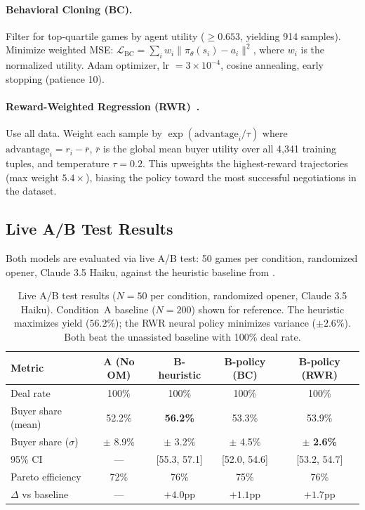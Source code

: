 \documentclass[11pt,a4paper]{article}
\begin{document}
\paragraph{Behavioral Cloning (BC).} Filter for top-quartile games by agent utility ($\geq 0.653$, yielding 914 samples). Minimize weighted MSE: $\mathcal{L}_\text{BC} = \sum_i w_i \|\pi_\theta(s_i) - a_i\|^2$, where $w_i$ is the normalized utility. Adam optimizer, lr $= 3 \times 10^{-4}$, cosine annealing, early stopping (patience 10).

\paragraph{Reward-Weighted Regression (RWR)~\citep{peters2007reinforcement}.} Use all data. Weight each sample by $\exp(\text{advantage}_i / \tau)$ where $\text{advantage}_i = r_i - \bar{r}$, $\bar{r}$ is the global mean buyer utility over all 4{,}341 training tuples, and temperature $\tau = 0.2$. This upweights the highest-reward trajectories (max weight $5.4\times$), biasing the policy toward the most successful negotiations in the dataset.

\subsection{Live A/B Test Results}

Both models are evaluated via live A/B test: 50 games per condition, randomized opener, Claude 3.5 Haiku, against the heuristic baseline from .

\begin{table}[t]
\centering
\caption{Live A/B test results ($N = 50$ per condition, randomized opener, Claude 3.5 Haiku). Condition~A baseline ($N = 200$) shown for reference. The heuristic maximizes yield ($56.2\%$); the RWR neural policy minimizes variance ($\pm 2.6\%$). Both beat the unassisted baseline with 100\% deal rate.}
\label{tab:policy_ab}
\begin{tabular}{lcccc}
\toprule
Metric & A (No OM) & B-heuristic & B-policy (BC) & B-policy (RWR) \\
\midrule
Deal rate & 100\% & 100\% & 100\% & 100\% \\
Buyer share (mean) & 52.2\% & \textbf{56.2\%} & 53.3\% & 53.9\% \\
Buyer share ($\sigma$) & $\pm$ 8.9\% & $\pm$ 3.2\% & $\pm$ 4.5\% & $\pm$ \textbf{2.6\%} \\
95\% CI & --- & [55.3, 57.1] & [52.0, 54.6] & [53.2, 54.7] \\
Pareto efficiency & 72\% & 76\% & 75\% & 76\% \\
$\Delta$ vs baseline & --- & $+4.0$pp & $+1.1$pp & $+1.7$pp \\
\bottomrule
\end{tabular}
\end{table}
\end{document}
